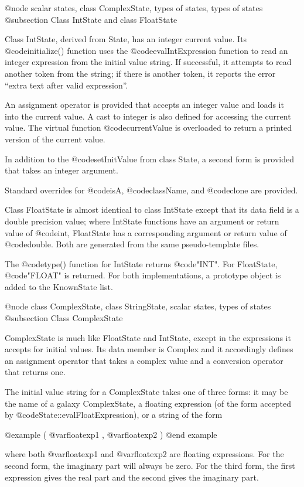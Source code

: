@node scalar states, class ComplexState, types of states, types of states
@subsection Class IntState and class FloatState

Class IntState, derived from State, has an integer current value.
Its @code{initialize()} function uses the @code{evalIntExpression}
function to read an integer expression from the initial value
string.  If successful, it attempts to read another token from
the string; if there is another token, it reports the error
``extra text after valid expression''.

An assignment operator is provided that accepts an integer value
and loads it into the current value.  A cast to integer is also
defined for accessing the current value.  The virtual function
@code{currentValue} is overloaded to return a printed version of
the current value.

In addition to the @code{setInitValue} from class State, a second
form is provided that takes an integer argument.

Standard overrides for @code{isA}, @code{className}, and @code{clone}
are provided.

Class FloatState is almost identical to class IntState except that
its data field is a double precision value; where IntState functions
have an argument or return value of @code{int}, FloatState has a
corresponding argument or return value of @code{double}.  Both are
generated from the same pseudo-template files.

The @code{type()} function for IntState returns @code{"INT"}.
For FloatState, @code{"FLOAT"} is returned.  For both implementations, a
prototype object is added to the KnownState list.

@node class ComplexState, class StringState, scalar states, types of states
@subsection Class ComplexState

ComplexState is much like FloatState and IntState, except in the
expressions it accepts for initial values.  Its data member is
Complex and it accordingly defines an assignment operator that takes a
complex value and a conversion operator that returns one.

The initial value string for a ComplexState takes one of three forms:
it may be the name of a galaxy ComplexState, a floating expression
(of the form accepted by @code{State::evalFloatExpression}), or a
string of the form

@example
( @var{floatexp1} , @var{floatexp2} )
@end example

where both @var{floatexp1} and @var{floatexp2} are floating expressions.
For the second form, the imaginary part will always be zero.  For the
third form, the first expression gives the real part and the second
gives the imaginary part.

